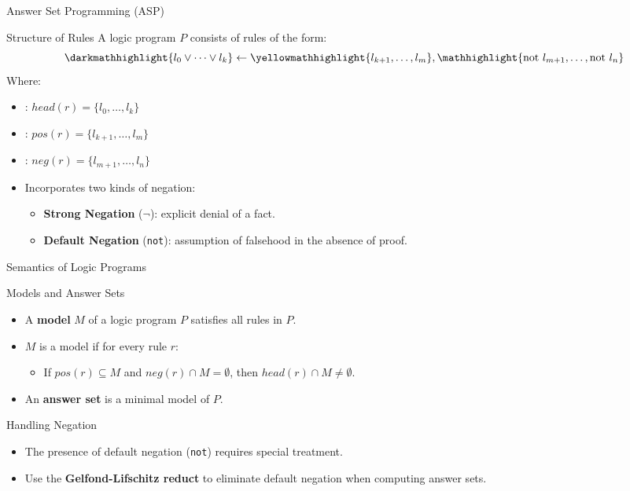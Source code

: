 \begin{frame}{Answer Set Programming (ASP)}
    \begin{alertblock}{Structure of Rules}
        A logic program \(P\) consists of rules of the form:
        \[
            \darkmathhighlight{l_0 \lor \dots \lor l_k} \leftarrow \yellowmathhighlight{l_{k+1}, \dots, l_m}, \mathhighlight{\text{not }l_{m+1}, \dots, \text{not }l_n}
        \]
        Where:
        \begin{itemize}
            \item {}: \(head(r) = \{l_0, \dots, l_k\}\)
            \item {}: \(pos(r) = \{l_{k+1}, \dots, l_m\}\)
            \item {}: \(neg(r) = \{l_{m+1}, \dots, l_n\}\)
        \end{itemize}
    \end{alertblock}
    \begin{itemize}
        \item Incorporates two kinds of negation:
              \begin{itemize}
                  \item \textbf{Strong Negation} ($\neg$): explicit denial of a fact.
                  \item \textbf{Default Negation} (\texttt{not}): assumption of falsehood in the absence of proof.
              \end{itemize}
    \end{itemize}
\end{frame}

\begin{frame}{Semantics of Logic Programs}
    \begin{block}{Models and Answer Sets}
        \begin{itemize}
            \item A \textbf{model} \(M\) of a logic program \(P\) satisfies all rules in \(P\).
            \item \(M\) is a model if for every rule \(r\):
                  \begin{itemize}
                      \item If \(pos(r) \subseteq M\) and \(neg(r) \cap M = \emptyset\), then \(head(r) \cap M \neq \emptyset\).
                  \end{itemize}
            \item An \textbf{answer set} is a minimal model of \(P\).
        \end{itemize}
    \end{block}
    \begin{block}{Handling Negation}
        \begin{itemize}
            \item The presence of default negation (\texttt{not}) requires special treatment.
            \item Use the \textbf{Gelfond-Lifschitz reduct} to eliminate default negation when computing answer sets.
        \end{itemize}
    \end{block}
\end{frame}

